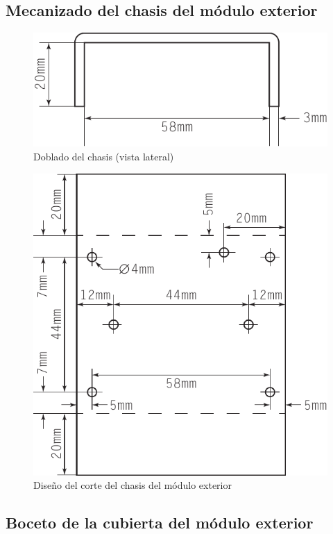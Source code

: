 \vfill

\subsection{Mecanizado del chasis del módulo exterior}

\vfill

\begin{figure}[H]
  \centering
  \includegraphics[width=0.8\columnwidth]{../design/exterior-skeleton-side}
  \caption{Doblado del chasis (vista lateral)}
  \label{fig:exterior-skeleton-side}
\end{figure}

\vfill

\clearpage

\begin{figure}
  \centering
  \includegraphics[height=0.8\columnwidth]{../design/exterior-skeleton-blueprint}
  \caption{Diseño del corte del chasis del módulo exterior}
  \label{fig:skeleton-skeleton-blueprint}
\end{figure}

\clearpage

\subsection{Boceto de la cubierta del módulo exterior}

